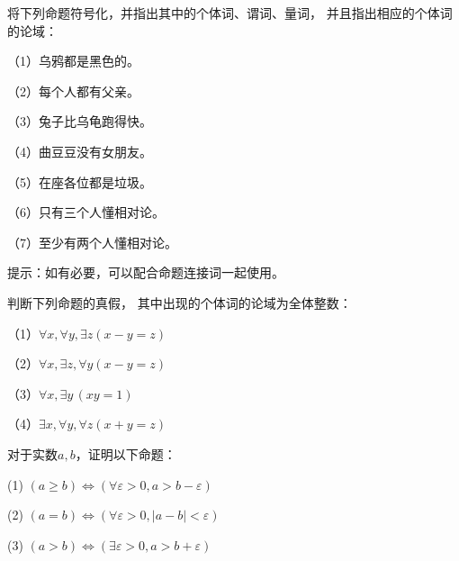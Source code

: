 \begin{prob}[量词的使用]
将下列命题符号化，并指出其中的个体词、谓词、量词，
并且指出相应的个体词的论域：

（1）乌鸦都是黑色的。

（2）每个人都有父亲。

（3）兔子比乌龟跑得快。

（4）曲豆豆没有女朋友。

（5）在座各位都是垃圾。

（6）只有三个人懂相对论。

（7）至少有两个人懂相对论。
\end{prob}

提示：如有必要，可以配合命题连接词一起使用。\vs

\begin{prob}判断下列命题的真假，
其中出现的个体词的论域为全体整数：

（1）$\forall x,\forall y,\exists z(x-y=z)$

（2）$\forall x,\exists z,\forall y(x-y=z)$

（3）$\forall x,\exists y\,(xy=1)$

（4）$\exists x,\forall y,\forall z(x+y=z)$
\end{prob}

\begin{prob}[分析学基本原理]
对于实数$a,b$，证明以下命题：

(1) $(a\geq b)\Leftrightarrow(\forall\varepsilon>0,a>b-\varepsilon)$

(2) $(a=b)\Leftrightarrow(\forall\varepsilon>0,|a-b|<\varepsilon)$

(3) $(a>b)\Leftrightarrow(\exists\varepsilon>0,a>b+\varepsilon)$

\end{prob}\vs







